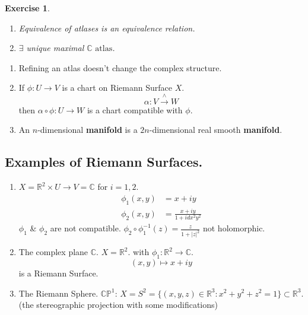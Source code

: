 \documentclass{article}
\newtheorem{exercise}{Exercise}
\begin{document}
\begin{exercise}
\begin{enumerate}
    \item Equivalence of atlases is an equivalence relation.
    \item $\exists$ unique maximal $\mathbb{C} \text{ atlas}$.
\end{enumerate}
\end{exercise}

\begin{remark}
    \begin{enumerate}[\upshape (i)]
        \item Refining an atlas doesn't change the complex structure.
        \item If $\phi : U \to V$ is a chart on Riemann Surface $X$.
        \[
        \alpha : V \xrightarrow{\wedge} W
        \]
        then $\alpha \circ \phi : U \to W$ is a chart compatible with $\phi$.
        \item An $n$-dimensional \textbf{manifold} is a $2n$-dimensional real smooth \textbf{manifold}.
    \end{enumerate}
\end{remark}

\subsection{Examples of Riemann Surfaces.}

\begin{example}
\begin{enumerate}
    The first example is a \textbf{Non-Examples:} 
    \item $X = \mathbb{R}^2 \times U \to V = \mathbb{C}$ for $i=1, 2$.
    \begin{align*}
        \phi_1 (x, y) &= x + iy \\
        \phi_2 (x, y) &= \frac{x+iy}{1+i dx^2 y^2}
    \end{align*}
    $\phi_1$ \& $\phi_2$ are not compatible.
    $\phi_2 \circ \phi_1^{-1} (z) = \frac{z}{1+|z|^2}$ not holomorphic.
    \item The complex plane $\mathbb{C}$.
    $X = \mathbb{R}^2$. with $\phi_1 : \mathbb{R}^2 \to \mathbb{C}$.
    \[
    (x, y) \mapsto x+iy
    \]
    is a Riemann Surface.
    \item The Riemann Sphere. $\mathbb{CP}^1$:
    $X = S^2 = \{ (x, y, z) \in \mathbb{R}^3 : x^2 + y^2 + z^2 = 1 \} \subset \mathbb{R}^3$.
    (the stereographic projection with some modifications)
\end{enumerate}
\end{example}
\end{document}
